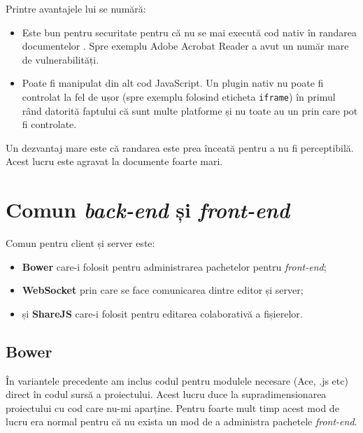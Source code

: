 \documentclass[a4wide,12pt]{report}
\newcommand{\eng}[1]{\emph{#1}} %
\newcommand{\cod}[1]{\texttt{#1}}
\newcommand{\acr}[1]{{\textsmaller[1]{\textsc{#1}}}} %
\begin{document}
Printre avantajele lui se numără:

\begin{itemize}

\item Este bun pentru securitate pentru că nu se mai execută cod nativ în
randarea documentelor \acr{PDF}. Spre exemplu Adobe Acrobat Reader a avut un
număr mare de vulnerabilități.

\item Poate fi manipulat din alt cod JavaScript. Un plugin nativ nu poate fi
controlat la fel de ușor (spre exemplu folosind eticheta \cod{iframe}) în primul
rând datorită faptului că sunt multe platforme și nu toate au un \acr{API} prin
care pot fi controlate.

\end{itemize}

Un dezvantaj mare este că randarea este prea înceată pentru a nu fi
perceptibilă. Acest lucru este agravat la documente foarte mari.

\section{Comun \eng{back-end} și \eng{front-end}}

Comun pentru client și server este:

\begin{itemize}

\item \textbf{Bower} care-i folosit pentru administrarea pachetelor pentru
\eng{front-end};

\item \textbf{WebSocket} prin care se face comunicarea dintre editor și server;

\item și \textbf{ShareJS} care-i folosit pentru editarea colaborativă a
fișierelor.

\end{itemize}

\subsection{Bower}
\label{bowersub}

În variantele precedente am inclus codul pentru modulele necesare (Ace,
\acr{PDF}.js etc) direct în codul sursă a proiectului. Acest lucru duce la
supradimensionarea proiectului cu cod care nu-mi aparține. Pentru foarte mult
timp acest mod de lucru era normal pentru că nu exista un mod de a administra
pachetele \eng{front-end}.
\end{document}
